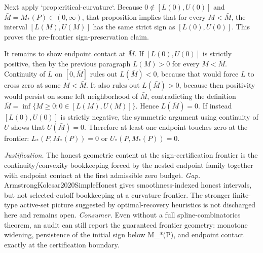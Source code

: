 \documentclass{article}
\begin{document}
Next apply `prop:critical-curvature`. Because \(0\notin[L(0),U(0)]\) and \(\bar M=M_*(P)\in(0,\infty)\), that proposition implies that for every \(M<\bar M\), the interval \([L(M),U(M)]\) has the same strict sign as \([L(0),U(0)]\). This proves the pre-frontier sign-preservation claim.

It remains to show endpoint contact at \(\bar M\). If \([L(0),U(0)]\) is strictly positive, then by the previous paragraph \(L(M)>0\) for every \(M<\bar M\). Continuity of \(L\) on \([0,\bar M]\) rules out \(L(\bar M)<0\), because that would force \(L\) to cross zero at some \(M<\bar M\). It also rules out \(L(\bar M)>0\), because then positivity would persist on some left neighborhood of \(\bar M\), contradicting the definition \(\bar M=\inf\{M\ge 0:0\in[L(M),U(M)]\}\). Hence \(L(\bar M)=0\). If instead \([L(0),U(0)]\) is strictly negative, the symmetric argument using continuity of \(U\) shows that \(U(\bar M)=0\). Therefore at least one endpoint touches zero at the frontier: \(L_*(P,M_*(P))=0\) or \(U_*(P,M_*(P))=0\).
\par\smallskip\noindent \textit{Justification.} The honest geometric content at the sign-certification frontier is the continuity/convexity bookkeeping forced by the nested endpoint family together with endpoint contact at the first admissible zero budget. \textit{Gap.} ArmstrongKolesar2020SimpleHonest gives smoothness-indexed honest intervals, but not selected-cutoff bookkeeping at a curvature frontier. The stronger finite-type active-set picture suggested by optimal-recovery heuristics is not discharged here and remains open. \textit{Consumer.} Even without a full spline-combinatorics theorem, an audit can still report the guaranteed frontier geometry: monotone widening, persistence of the initial sign below M_*(P), and endpoint contact exactly at the certification boundary.
\end{document}
